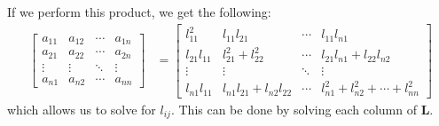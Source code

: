 \documentclass{article}
\begin{document}
If we perform this product, we get the following:
\begin{align*}
    \begin{bmatrix*}
        a_{11} & a_{12} & \cdots & a_{1n} \\
        a_{21} & a_{22} & \cdots & a_{2n} \\
        \vdots & \vdots & \ddots & \vdots \\
        a_{n1} & a_{n2} & \cdots & a_{nn}
    \end{bmatrix*} & = \begin{bmatrix*}
                           l_{11}^2        & l_{11} l_{21} & \cdots & l_{11} l_{n1} \\
                           l_{21} l_{11} & l_{21}^2 + l_{22}^2 & \cdots & l_{21} l_{n1} + l_{22} l_{n2} \\
                           \vdots        & \vdots & \ddots & \vdots \\
                           l_{n1} l_{11} & l_{n1} l_{21} + l_{n2} l_{22} & \cdots & l_{n1}^2 + l_{n2}^2 + \cdots + l_{nn}^2
                       \end{bmatrix*}
\end{align*}
which allows us to solve for \(l_{ij}\). This can be done by solving each column of \(\symbf{L}\).
\end{document}
